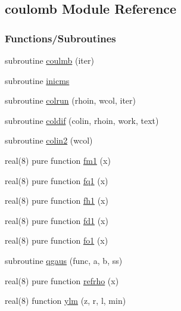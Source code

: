 \hypertarget{namespacecoulomb}{}\subsection{coulomb Module Reference}
\label{namespacecoulomb}
\subsubsection*{Functions/\+Subroutines}
\begin{DoxyCompactItemize}
\item 
subroutine \hyperlink{namespacecoulomb_aa3e07b3e57f999248a4455e242a08a82}{coulmb} (iter)
\item 
subroutine \hyperlink{namespacecoulomb_a71d2dcc1344753ecd57ec7701f3f31b1}{inicms}
\item 
subroutine \hyperlink{namespacecoulomb_a5899dd9afaa8627e389d6826ac8b9356}{colrun} (rhoin, wcol, iter)
\item 
subroutine \hyperlink{namespacecoulomb_a3ac2bcc29280c44868fa4b084e391d9b}{coldif} (colin, rhoin, work, text)
\item 
subroutine \hyperlink{namespacecoulomb_ae21242beace81666adc0b8bb2169ebe7}{colin2} (wcol)
\item 
real(8) pure function \hyperlink{namespacecoulomb_a8e0d9a77cf57de887f33aa23a850282e}{fm1} (x)
\item 
real(8) pure function \hyperlink{namespacecoulomb_a479d5221bb08a0de30ab429406600221}{fq1} (x)
\item 
real(8) pure function \hyperlink{namespacecoulomb_a3a7b49f543c1e4b721ba4de54daa1c10}{fh1} (x)
\item 
real(8) pure function \hyperlink{namespacecoulomb_a236fa98bfaa5df522910063c93eacb88}{fd1} (x)
\item 
real(8) pure function \hyperlink{namespacecoulomb_a80a8fbc67f2192f8d89c4bfb8b936058}{fo1} (x)
\item 
subroutine \hyperlink{namespacecoulomb_a7a8e275790d560b09ae8acb5a02cb905}{qgaus} (func, a, b, ss)
\item 
real(8) pure function \hyperlink{namespacecoulomb_ad214b3c159dee54bdffd506cea64a056}{refrho} (x)
\item 
real(8) function \hyperlink{namespacecoulomb_a320b9e470846321992301fb5cfd25304}{ylm} (z, r, l, min)
\end{DoxyCompactItemize}
